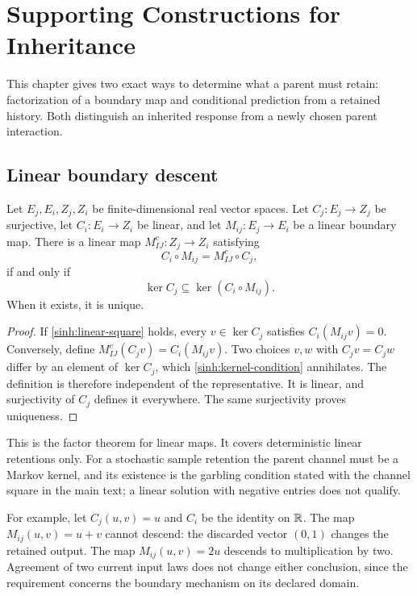 \chapter{Supporting Constructions for Inheritance}
\label{s:inheritance}

This chapter gives two exact ways to determine what a parent must retain:
factorization of a boundary map and conditional prediction from a retained
history. Both distinguish an inherited response from a newly chosen parent
interaction.

\section{Linear boundary descent}

Let $E_j,E_i,Z_j,Z_i$ be finite-dimensional real vector spaces. Let
$C_j:E_j\to Z_j$ be surjective, let $C_i:E_i\to Z_i$ be linear, and let
$M_{ij}:E_j\to E_i$ be a linear boundary map. There is a linear map
$M_{IJ}^c:Z_j\to Z_i$ satisfying
\begin{equation}
 C_i\circ M_{ij}=M_{IJ}^c\circ C_j,
 \label{sinh:linear-square}
\end{equation}
if and only if
\begin{equation}
 \ker C_j\subseteq\ker(C_i\circ M_{ij}).
 \label{sinh:kernel-condition}
\end{equation}
When it exists, it is unique.

\begin{proof}
If \cref{sinh:linear-square} holds, every $v\in\ker C_j$ satisfies
$C_i(M_{ij}v)=0$. Conversely, define
$M_{IJ}^c(C_jv)=C_i(M_{ij}v)$. Two choices $v,w$ with $C_jv=C_jw$ differ
by an element of $\ker C_j$, which \cref{sinh:kernel-condition}
annihilates. The definition is therefore independent of the representative.
It is linear, and surjectivity of $C_j$ defines it everywhere. The same
surjectivity proves uniqueness.
\end{proof}

This is the factor theorem for linear maps. It covers deterministic linear
retentions only. For a stochastic sample retention the parent channel must be
a Markov kernel, and its existence is the garbling condition stated with the
channel square in the main text; a linear solution with negative entries does
not qualify.

For example, let $C_j(u,v)=u$ and $C_i$ be the identity on $\mathbb R$. The
map $M_{ij}(u,v)=u+v$ cannot descend: the discarded vector $(0,1)$ changes
the retained output. The map $M_{ij}(u,v)=2u$ descends to multiplication
by two. Agreement of two current input laws does not change either
conclusion, since the requirement concerns the boundary mechanism on its
declared domain.

